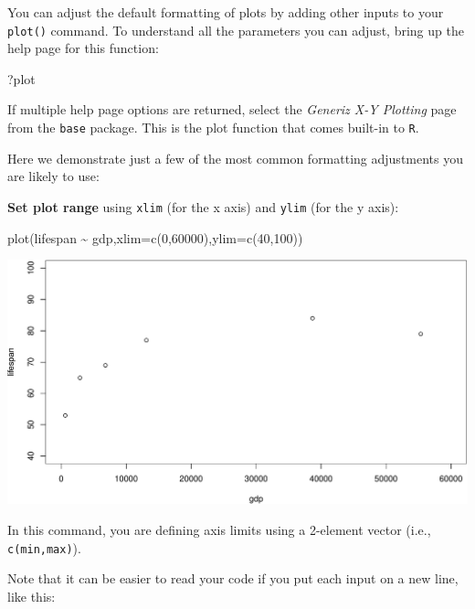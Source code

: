 \documentclass[
]{book}
\newenvironment{Shaded}{\begin{snugshade}}{\end{snugshade}}
\newcommand{\AttributeTok}[1]{\textcolor[rgb]{0.77,0.63,0.00}{#1}}
\newcommand{\DecValTok}[1]{\textcolor[rgb]{0.00,0.00,0.81}{#1}}
\newcommand{\FunctionTok}[1]{\textcolor[rgb]{0.00,0.00,0.00}{#1}}
\newcommand{\NormalTok}[1]{#1}
\newcommand{\SpecialCharTok}[1]{\textcolor[rgb]{0.00,0.00,0.00}{#1}}
\begin{document}
You can adjust the default formatting of plots by adding other inputs to your \texttt{plot()} command. To understand all the parameters you can adjust, bring up the help page for this function:

\begin{Shaded}
\begin{Highlighting}[]
\NormalTok{?plot}
\end{Highlighting}
\end{Shaded}

If multiple help page options are returned, select the \emph{Generiz X-Y Plotting} page from the \texttt{base} package. This is the plot function that comes built-in to \texttt{R}.

Here we demonstrate just a few of the most common formatting adjustments you are likely to use:

\textbf{Set plot range} using \texttt{xlim} (for the x axis) and \texttt{ylim} (for the y axis):

\begin{Shaded}
\begin{Highlighting}[]
\FunctionTok{plot}\NormalTok{(lifespan }\SpecialCharTok{\textasciitilde{}}\NormalTok{ gdp,}\AttributeTok{xlim=}\FunctionTok{c}\NormalTok{(}\DecValTok{0}\NormalTok{,}\DecValTok{60000}\NormalTok{),}\AttributeTok{ylim=}\FunctionTok{c}\NormalTok{(}\DecValTok{40}\NormalTok{,}\DecValTok{100}\NormalTok{))}
\end{Highlighting}
\end{Shaded}

\includegraphics{figures/unnamed-chunk-101-1.pdf}

In this command, you are defining axis limits using a 2-element vector (i.e., \texttt{c(min,max)}).

Note that it can be easier to read your code if you put each input on a new line, like this:
\end{document}
